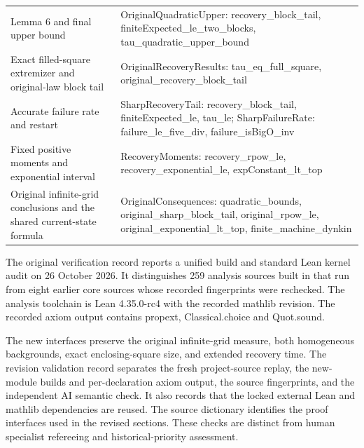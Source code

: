 \documentclass[
  11pt,
  a4paper,
]{article}
\begin{document}
\begin{longtable}[]{@{}
  >{\raggedright\arraybackslash}p{}
  >{\raggedright\arraybackslash}p{}@{}}
Lemma 6 and final upper bound & OriginalQuadraticUpper:
recovery\_\allowbreak block\_\allowbreak tail, finiteExpected\_\allowbreak le\_\allowbreak two\_\allowbreak blocks,
tau\_\allowbreak quadratic\_\allowbreak upper\_\allowbreak bound \\
Exact filled-square extremizer and original-law block tail &
OriginalRecoveryResults: tau\_\allowbreak eq\_\allowbreak full\_\allowbreak square,
original\_\allowbreak recovery\_\allowbreak block\_\allowbreak tail \\
Accurate failure rate and restart & SharpRecoveryTail:
recovery\_\allowbreak block\_\allowbreak tail, finiteExpected\_\allowbreak le, tau\_\allowbreak le; SharpFailureRate:
failure\_\allowbreak le\_\allowbreak five\_\allowbreak div, failure\_\allowbreak isBigO\_\allowbreak inv \\
Fixed positive moments and exponential interval & RecoveryMoments:
recovery\_\allowbreak rpow\_\allowbreak le, recovery\_\allowbreak exponential\_\allowbreak le, expConstant\_\allowbreak lt\_\allowbreak top \\
Original infinite-grid conclusions and the shared current-state formula
& OriginalConsequences: quadratic\_\allowbreak bounds, original\_\allowbreak sharp\_\allowbreak block\_\allowbreak tail,
original\_\allowbreak rpow\_\allowbreak le, original\_\allowbreak exponential\_\allowbreak lt\_\allowbreak top,
finite\_\allowbreak machine\_\allowbreak dynkin \\
\end{longtable}

The original verification record reports a unified build and standard
Lean kernel audit on 26 October 2026. It distinguishes 259 analysis
sources built in that run from eight earlier core sources whose recorded
fingerprints were rechecked. The analysis toolchain is Lean 4.35.0-rc4
with the recorded mathlib revision. The recorded axiom output contains
propext, Classical.choice and Quot.sound.

The new interfaces preserve the original infinite-grid measure, both
homogeneous backgrounds, exact enclosing-square size, and extended
recovery time. The revision validation record separates the fresh
project-source replay, the new-module builds and per-declaration axiom
output, the source fingerprints, and the independent AI semantic check.
It also records that the locked external Lean and mathlib dependencies
are reused. The source dictionary identifies the proof interfaces used
in the revised sections. These checks are distinct from human specialist
refereeing and historical-priority assessment.
\end{document}
